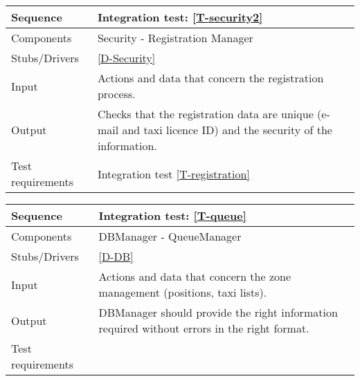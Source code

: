 \begin{table}[H]
    \begin{tabularx}{\textwidth}{l|X}
        \hline
        Sequence
        & 
        Integration test: \ref{T-security2}
        \\ \hline
        Components 
        & 
        Security - Registration Manager
        \\ \hline
        Stubs/Drivers 
        & 
        \ref{D-Security}
        \\ \hline
        Input 
        & 
        Actions and data that concern the registration process. 
        \\ \hline
        Output 
        & 
        Checks that the registration data are unique (e-mail and taxi licence ID) and the security of the information.
        \\ \hline
        Test requirements 
        & 
        Integration test \ref{T-registration}
        \\ \hline
    \end{tabularx}
\end{table}

\begin{table}[H]
    \begin{tabularx}{\textwidth}{l|X}
        \hline
        Sequence
        & 
        Integration test: \ref{T-queue}
        \\ \hline
        Components 
        & 
        DBManager - QueueManager
        \\ \hline
        Stubs/Drivers 
        & 
        \ref{D-DB}
        \\ \hline
        Input 
        & 
        Actions and data that concern the zone management (positions, taxi lists). 
        \\ \hline
        Output 
        & 
        DBManager should provide the right information required without errors in the right format.
        \\ \hline
        Test requirements 
        & 
        
        \\ \hline
    \end{tabularx}
\end{table}

